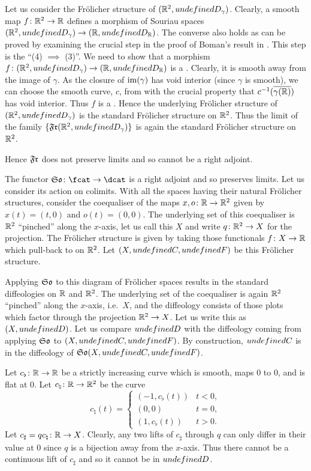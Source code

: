 \documentclass[%
a4paper,%
arxiv,%
defaults
]{myclass}
\begin{document}
Let us consider the Fr\"olicher structure of \((\R^2, \m{D}_\gamma)\).
Clearly, a smooth map \(f \colon \mathbb{R}^2 \to \mathbb{R}\)
defines a morphism of Souriau spaces
 \((\R^2, \m{D}_\gamma) \to (\R, \m{D}_{\R})\).
The converse also holds as can be proved by examining the crucial step in the proof of Boman's result in \cite[3.4]{akpm}.
This step is the ``(4) \(\implies\) (3)''.
We need to show that a morphism
 \(f \colon (\R^2, \m{D}_\gamma) \to (\R, \m{D}_{\R})\)
is a \cimap.
Clearly, it is smooth away from the image of \(\gamma\).
As the closure of \(\operatorname{im}(\gamma)\) has void interior (since \(\gamma\) is smooth), we can choose the smooth curve, \(c\), from \cite[3.4]{akpm} with the crucial property that
 \(c^{-1}(\overline{\gamma(\mathbb{R})})\)
has void interior.
Thus \(f\) is a \cimap.
Hence the underlying Fr\"olicher structure of \((\R^2, \m{D}_\gamma)\)
is the standard Fr\"olicher structure on \(\mathbb{R}^2\).
Thus the limit of the family
 \(\{\SoFr(\R^2, \m{D}_\gamma)\}\)
is again the standard Fr\"olicher structure on \(\mathbb{R}^2\).

Hence \(\SoFr\) does not preserve limits and so cannot be a right adjoint.

\medskip

The functor
 \(\FrSo \colon \fcat \to \dcat\)
is a right adjoint and so preserves limits.
Let us consider its action on colimits.
With all the spaces having their natural Fr\"olicher structures, consider the coequaliser of the maps
 \(x, o \colon \mathbb{R} \to \mathbb{R}^2\)
given by \(x(t) = (t,0)\) and \(o(t) = (0,0)\).
The underlying set of this coequaliser is \(\mathbb{R}^2\) ``pinched'' along the \(x\)\hyp{}axis, let us call this \(X\) and write \(q \colon \mathbb{R}^2 \to X\) for the projection.
The Fr\"olicher structure is given by taking those functionals \(f \colon X \to \mathbb{R}\) which pull\hyp{}back to \cimaps on \(\mathbb{R}^2\).
Let \((X, \m{C}, \m{F})\) be this Fr\"olicher structure.

Applying \(\FrSo\) to this diagram of Fr\"olicher spaces results in the standard diffeologies on \(\mathbb{R}\) and \(\mathbb{R}^2\).
The underlying set of the coequaliser is again \(\mathbb{R}^2\) ``pinched'' along the \(x\)\hyp{}axis, i.e.~\(X\), and the diffeology consists of those plots which factor through the projection \(\mathbb{R}^2 \to X\).
Let us write this as \((X, \m{D})\).
Let us compare \(\m{D}\) with the diffeology coming from applying \(\FrSo\) to \((X, \m{C}, \m{F})\).
By construction, \(\m{C}\) is in the diffeology of \(\FrSo(X, \m{C}, \m{F})\).

Let
 \(c_\flat \colon \mathbb{R} \to \mathbb{R}\)
be a strictly increasing curve which is smooth, maps \(0\) to \(0\), and is flat at \(0\).
Let
 \(c_\natural \colon \mathbb{R} \to \mathbb{R}^2\)
be the curve
%
\[
 c_\natural(t) = \begin{cases} (-1, c_\flat(t)) &
  t < 0, \\
  (0,0) & t = 0, \\
  (1, c_\flat(t)) & t > 0.
 \end{cases}
\]
%
Let
 \(c_\sharp = q c_\natural \colon \mathbb{R} \to X\).
Clearly, any two lifts of \(c_\sharp\) through \(q\) can only differ in their value at \(0\) since \(q\) is a bijection away from the \(x\)\hyp{}axis.
Thus there cannot be a continuous lift of \(c_\sharp\) and so it cannot be in \(\m{D}\).
\end{document}
